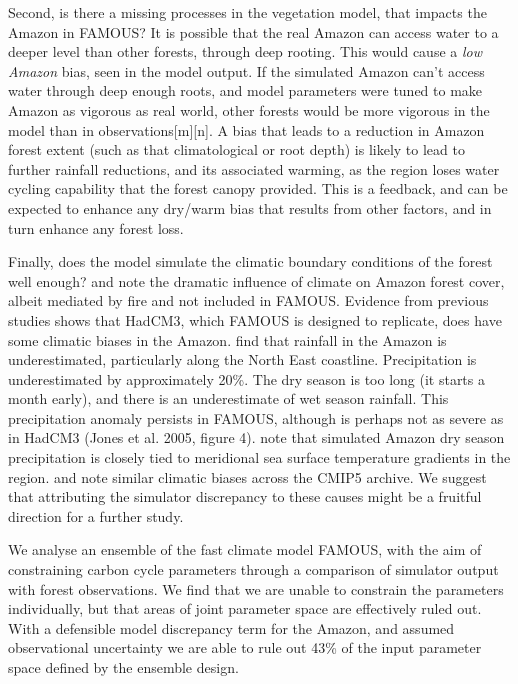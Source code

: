 \documentclass[esd, manuscript]{copernicus}
\begin{document}
Second, is there a missing processes in the vegetation model, that impacts the Amazon in FAMOUS? It is possible that the real Amazon can access water to a deeper level than other forests, through deep rooting. This would cause a \emph{low Amazon} bias, seen in the model output. If the simulated Amazon can't access water through deep enough roots, and model parameters were tuned to make Amazon as vigorous as real world, other forests would be more vigorous in the model than in observations[m][n]. A bias that leads to a reduction in Amazon forest extent (such as that climatological or root depth) is likely to lead to further rainfall reductions, and its associated warming, as the region loses water cycling capability that the forest canopy provided.  This is a feedback, and can be expected to enhance any dry/warm bias that results from other factors, and in turn enhance any forest loss.

Finally, does the model simulate the climatic boundary conditions of the forest well enough? \citep{malhi2009amazon} and \citep{staver2011determinants} note the dramatic influence of climate on Amazon forest cover, albeit mediated by fire and not included in FAMOUS. Evidence from previous studies shows that HadCM3, which FAMOUS is designed to replicate, does have some climatic biases in the Amazon.\citep{cox2004amazon} find that rainfall in the Amazon is underestimated, particularly along the North East coastline. Precipitation is underestimated by approximately 20\%. The dry season is too long (it starts a month early), and there is an underestimate of wet season rainfall. This precipitation anomaly persists in FAMOUS, although is perhaps not as severe as in HadCM3 (Jones et al. 2005, figure 4). \citep{good2008objective} note that simulated Amazon dry season precipitation is closely tied to meridional sea surface temperature gradients in the region. \citep{joetzjer2013amazon} and \citep{yin2012precipitation} note similar climatic biases across the CMIP5 archive. We suggest that attributing the simulator discrepancy to these causes might be a fruitful direction for a further study.

\conclusions  %

We analyse an ensemble of the fast climate model FAMOUS, with the aim of constraining carbon cycle parameters through a comparison of simulator output with forest observations. We find that we are unable to constrain the parameters individually, but that areas of joint parameter space are effectively ruled out. With a defensible model discrepancy term for the Amazon, and assumed observational uncertainty we are able to rule out 43\% of the input parameter space defined by the ensemble design.
\end{document}
